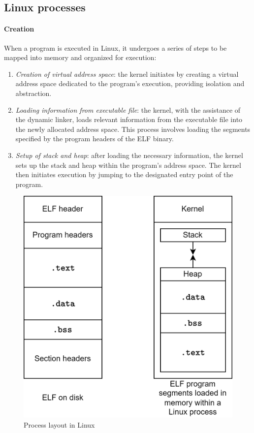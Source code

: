 \subsection{Linux processes}
\paragraph*{Creation}
When a program is executed in Linux, it undergoes a series of steps to be mapped into memory and organized for execution:
\begin{enumerate}
    \item \textit{Creation of virtual address space}: the kernel initiates by creating a virtual address space dedicated to the program's execution, providing isolation and abstraction.
    \item \textit{Loading information from executable file}: the kernel, with the assistance of the dynamic linker, loads relevant information from the executable file into the newly allocated address space. 
        This process involves loading the segments specified by the program headers of the ELF binary.
    \item \textit{Setup of stack and heap}: after loading the necessary information, the kernel sets up the stack and heap within the program's address space. 
        The kernel then initiates execution by jumping to the designated entry point of the program.
\end{enumerate}
\begin{figure}[H]
    \centering
    \includegraphics[width=0.4\linewidth]{images/linux.png}
    \caption{Process layout in Linux}
\end{figure}

